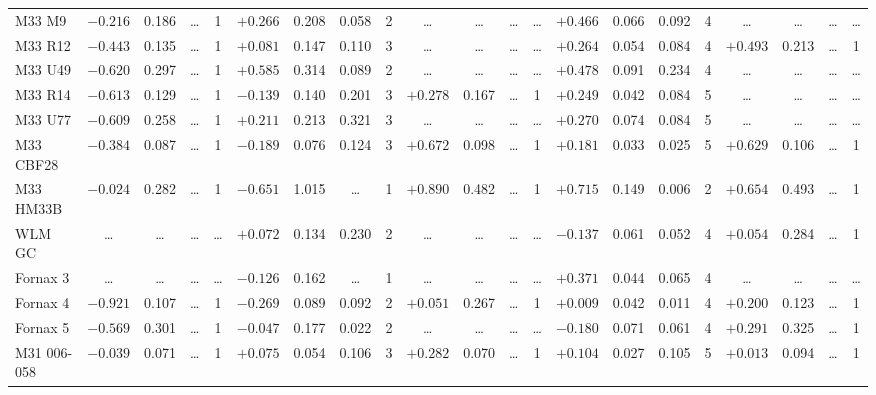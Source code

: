 \documentclass{aa}
\begin{document}
\begin{appendix}
\begin{table*}
\begin{adjustbox}{width=1\textwidth}
{\begin{tabular}{l cccccccccccccccccccc}
M33 M9        & $-0.216$ & 0.186 & \ldots & 1 & $+0.266$ & 0.208 & 0.058 & 2 & \ldots & \ldots & \ldots & \ldots & $+0.466$ & 0.066 & 0.092 & 4 & \ldots & \ldots & \ldots & \ldots \\
M33 R12       & $-0.443$ & 0.135 & \ldots & 1 & $+0.081$ & 0.147 & 0.110 & 3 & \ldots & \ldots & \ldots & \ldots & $+0.264$ & 0.054 & 0.084 & 4 & $+0.493$ & 0.213 & \ldots & 1 \\
M33 U49       & $-0.620$ & 0.297 & \ldots & 1 & $+0.585$ & 0.314 & 0.089 & 2 & \ldots & \ldots & \ldots & \ldots & $+0.478$ & 0.091 & 0.234 & 4 & \ldots & \ldots & \ldots & \ldots \\
M33 R14       & $-0.613$ & 0.129 & \ldots & 1 & $-0.139$ & 0.140 & 0.201 & 3 & $+0.278$ & 0.167 & \ldots & 1 & $+0.249$ & 0.042 & 0.084 & 5 & \ldots & \ldots & \ldots & \ldots \\
M33 U77       & $-0.609$ & 0.258 & \ldots & 1 & $+0.211$ & 0.213 & 0.321 & 3 & \ldots & \ldots & \ldots & \ldots & $+0.270$ & 0.074 & 0.084 & 5 & \ldots & \ldots & \ldots & \ldots \\
M33 CBF28     & $-0.384$ & 0.087 & \ldots & 1 & $-0.189$ & 0.076 & 0.124 & 3 & $+0.672$ & 0.098 & \ldots & 1 & $+0.181$ & 0.033 & 0.025 & 5 & $+0.629$ & 0.106 & \ldots & 1 \\
M33 HM33B     & $-0.024$ & 0.282 & \ldots & 1 & $-0.651$ & 1.015 & \ldots & 1 & $+0.890$ & 0.482 & \ldots & 1 & $+0.715$ & 0.149 & 0.006 & 2 & $+0.654$ & 0.493 & \ldots & 1 \\
WLM GC        & \ldots & \ldots & \ldots & \ldots & $+0.072$ & 0.134 & 0.230 & 2 & \ldots & \ldots & \ldots & \ldots & $-0.137$ & 0.061 & 0.052 & 4 & $+0.054$ & 0.284 & \ldots & 1 \\
Fornax 3      & \ldots & \ldots & \ldots & \ldots & $-0.126$ & 0.162 & \ldots & 1 & \ldots & \ldots & \ldots & \ldots & $+0.371$ & 0.044 & 0.065 & 4 & \ldots & \ldots & \ldots & \ldots \\
Fornax 4      & $-0.921$ & 0.107 & \ldots & 1 & $-0.269$ & 0.089 & 0.092 & 2 & $+0.051$ & 0.267 & \ldots & 1 & $+0.009$ & 0.042 & 0.011 & 4 & $+0.200$ & 0.123 & \ldots & 1 \\
Fornax 5      & $-0.569$ & 0.301 & \ldots & 1 & $-0.047$ & 0.177 & 0.022 & 2 & \ldots & \ldots & \ldots & \ldots & $-0.180$ & 0.071 & 0.061 & 4 & $+0.291$ & 0.325 & \ldots & 1 \\
M31 006-058   & $-0.039$ & 0.071 & \ldots & 1 & $+0.075$ & 0.054 & 0.106 & 3 & $+0.282$ & 0.070 & \ldots & 1 & $+0.104$ & 0.027 & 0.105 & 5 & $+0.013$ & 0.094 & \ldots & 1 \\

\end{tabular}}
\end{adjustbox}
\end{table*}
\end{appendix}
\end{document}
